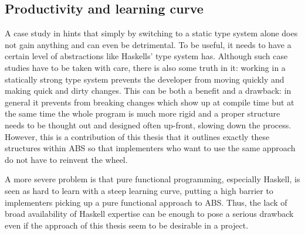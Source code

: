 \subsection{Productivity and learning curve}
A case study in \cite{hanenberg_experiment_2010} hints that simply by switching to a static type system alone does not gain anything and can even be detrimental. To be useful, it needs to have a certain level of abstractions like Haskells' type system has. Although such case studies have to be taken with care, there is also some truth in it: working in a statically strong type system prevents the developer from moving quickly and making quick and dirty changes. This can be both a benefit and a drawback: in general it prevents from breaking changes which show up at compile time but at the same time the whole program is much more rigid and a proper structure needs to be thought out and designed often up-front, slowing down the process. However, this is a contribution of this thesis that it outlines exactly these structures within ABS so that implementers who want to use the same approach do not have to reinvent the wheel.

A more severe problem is that pure functional programming, especially Haskell, is seen as hard to learn with a steep learning curve, putting a high barrier to implementers picking up a pure functional approach to ABS. Thus, the lack of broad availability of Haskell expertise can be enough to pose a serious drawback even if the approach of this thesis seem to be desirable in a project.